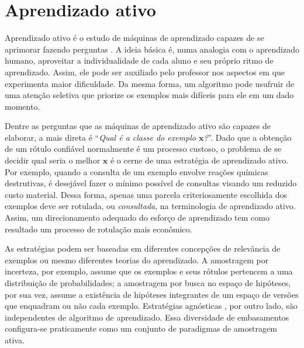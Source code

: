\section{Aprendizado ativo}\label{aa}
Aprendizado ativo é o estudo de máquinas
de aprendizado capazes de se aprimorar fazendo perguntas
\citep{series/synthesis/2012Settles}.
A ideia básica é, numa analogia com o aprendizado humano,
aproveitar a individualidade de cada aluno e seu próprio ritmo de aprendizado.
Assim, ele pode ser auxiliado pelo professor nos aspectos em que experimenta
maior dificuldade.
Da mesma forma, um algoritmo pode usufruir de uma atenção seletiva que
priorize os exemplos mais difíceis para ele em um dado momento.

Dentre as perguntas que as máquinas de aprendizado ativo são capazes de
elaborar, a mais direta é ``\textit{Qual é a classe do exemplo $\bm{x}$?}''.
Dado que a obtenção de um rótulo confiável normalmente é um processo custoso,
o problema de se decidir qual seria o melhor $\bm{x}$ é o cerne de uma estratégia de
aprendizado ativo.
Por exemplo, quando a consulta de um exemplo envolve reações químicas
destrutivas, é desejável fazer o mínimo possível de consultas visando um reduzido
custo material.
Dessa forma, apenas uma parcela criteriosamente escolhida dos exemplos deve
ser rotulada, ou \textit{consultada}, na terminologia de aprendizado ativo.
Assim, um direcionamento adequado do esforço de aprendizado tem como resultado um
processo de rotulação mais econômico.

As estratégias podem ser baseadas em diferentes concepções de relevância de
exemplos ou mesmo diferentes teorias do aprendizado.
A amostragem por incerteza,
por exemplo, assume que os exemplos e seus rótulos pertencem a uma
distribuição de probabilidades;
a amostragem por busca no espaço de hipóteses, por sua vez, assume a existência
de hipóteses integrantes de
um espaço de versões \citep{books/daglib/0087929}
que enquadram ou não cada exemplo.
Estratégias agnósticas \citep{journals/jcss/BalcanBL09}, por outro lado,
são independentes de algoritmo de aprendizado.
Essa diversidade de embasamentos configura-se praticamente como um conjunto de
paradigmas de amostragem ativa.

